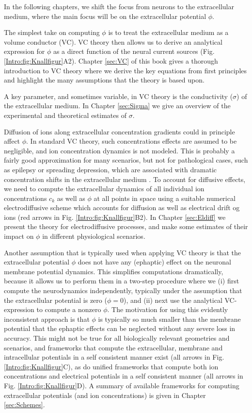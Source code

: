 In the following chapters, we shift the focus from neurons to the extracellular medium, where the main focus will be on the extracellular potential $\phi$.


The simplest take on computing $\phi$ is to treat the extracellular medium as a volume conductor (VC). VC theory then allows us to derive an analytical expression for $\phi$ as a direct function of the neural current sources (Fig. \ref{Intro:fig:Knallfigur}A2). Chapter \ref{sec:VC} of this book gives a thorough introduction to VC theory where we derive the key equations from first principles and highlight the many assumptions that the theory is based upon.

A key parameter, and sometimes variable, in VC theory is the conductivity ($\sigma$) of the extracellular medium. In Chapter \ref{sec:Sigma} we give an overview of the experimental and theoretical estimates of $\sigma$. 

Diffusion of ions along extracellular concentration gradients could in principle affect $\phi$. In standard VC theory, such concentrations effects are assumed to be negligible, and ion concentration dynamics is not modeled. This is probably a fairly good approximation for many scenarios, but not for pathological cases, such as epilepsy or spreading depression, which are associated with dramatic concentration shifts in the extracellular medium \cite{Somjen2001, Frohlich2008, Zandt2015review, Ayata2015}. To account for diffusive effects, we need to compute the extracellular dynamics of all individual ion concentrations $c_k$ as well as $\phi$ at all points in space using a suitable numerical electrodiffusive scheme which accounts for diffusion as well as electrical drift og ions (red arrows in Fig. \ref{Intro:fig:Knallfigur}B2). In Chapter \ref{sec:Eldiff} we present the theory for electrodiffusive processes, and make some estimates of their impact on $\phi$ in different physiological scenarios. 

Another assumption that is typically used when applying VC theory is that the extracellular potential $\phi$ does not have any (ephaptic) effect on the neuronal membrane potential dynamics. This simplifies computations dramatically, because it allows us to perform them in a two-step procedure where we (i) first compute the neurodynamics independently, typically under the assumption that the extracellular potential is zero ($\phi = 0$), and (ii) next use the analytical VC-expression to compute a nonzero $\phi$. The motivation for using this evidently inconsistent approach is that $\phi$ is typically so much smaller than the membrane potential that the ephaptic effects can be neglected without any severe loss in accuracy. This might not be true for all biologically relevant geometries and scenarios, and frameworks that compute the extracellular, membrane and intracellular potentials in a self consistent manner exist (all arrows in Fig. \ref{Intro:fig:Knallfigur}C), as do unified frameworks that compute both ion concentrations and electrical potentials in a self consistent manner (all arrows in Fig. \ref{Intro:fig:Knallfigur}D). A summary of available frameworks for computing extracellular potentials (and ion concentrations) is given in Chapter \ref{sec:Schemes}.


